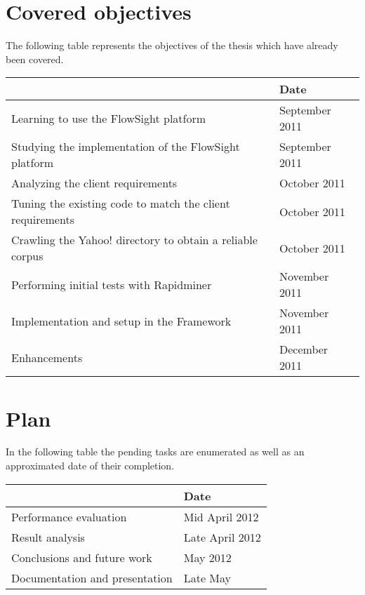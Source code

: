 \documentclass[12pt, a4paper , titlepage]{report}
\begin{document}
\chapter{Covered objectives}

The following table represents the objectives of the thesis which have already been covered.

\begin{center}  
    \begin{tabular}{ | p{10cm} | l |}
    \hline
    \rowcolor{lightgray}{\bf Objective} & {\bf Date} \\ \hline
    Learning to use the FlowSight platform & September 2011 \\ \hline 
    Studying the implementation of the FlowSight platform  & September 2011 \\ \hline
    Analyzing the client requirements & October 2011 \\ \hline
    Tuning the existing code to match the client requirements & October 2011 \\ \hline
    Crawling the Yahoo! directory to obtain a reliable corpus & October 2011\\ \hline
    Performing initial tests with Rapidminer & November 2011 \\ \hline
    Implementation and setup in the Framework & November 2011\\ \hline
    Enhancements & December 2011\\ \hline
    \end{tabular}
\end{center}

\chapter{Plan}
In the following table the pending tasks are enumerated as well as an approximated date of their completion.
\begin{center}
    \begin{tabular}{ | p{10cm} | l |}
    \hline
    \rowcolor{lightgray}{\bf Objective} & {\bf Date} \\ \hline
    Performance evaluation & Mid April 2012\\ \hline
    Result analysis & Late April 2012\\ \hline
    Conclusions and future work & May 2012\\ \hline
    Documentation and presentation & Late May\\ \hline
    \end{tabular}
\end{center}
 
\end{document}
